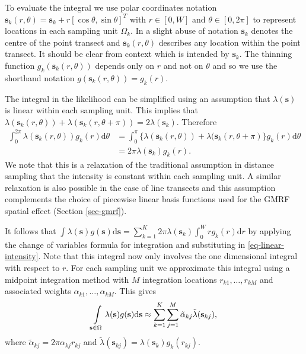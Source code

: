 \documentclass{statsoc}
\newcommand{\bs}{\mathbf{s}}
\newcommand{\tl}{\tilde{\lambda}}   %
\begin{document}
To evaluate the integral we use polar coordinates notation $\bs_k(r, \theta) = \bs_k + r\left[\cos\theta, \sin\theta \right]^T$ with $r \in [0, W]$ and $\theta \in [0, 2\pi]$ to represent locations in each sampling unit $\Omega_k$.  In a slight abuse of notation $\bs_k$ denotes the centre of the point transect and $\bs_k(r,\theta)$ describes any location within the point transect.  It should be clear from context which is intended by $\bs_k$.   The thinning function $g_k(\bs_k(r, \theta))$ depends only on $r$ and not on $\theta$ and so we use the shorthand notation $ g(\bs_k(r, \theta)) = g_k(r)$. 

The integral in the likelihood can be simplified using an assumption that $\lambda(\bs)$ is linear within each sampling unit.  This implies that $\lambda(\bs_k(r, \theta)) + \lambda(\bs_k(r, \theta + \pi)) = 2\lambda(\bs_k)$.  Therefore
\begin{align}
\label{eq-linear-intensity}
	\int_0^{2\pi} \lambda(\bs_k(r, \theta))g_k(r)\mathrm{d}\theta &= \int_0^\pi \{\lambda(\bs_k(r, \theta)) + \lambda(\bs_k(r, \theta + \pi) \} g_k(r)\mathrm{d}\theta \nonumber \\
	&= 2\pi \lambda(\bs_k)g_k(r).
\end{align}
We note that this is a relaxation of the traditional assumption in distance sampling that the intensity is constant within each sampling unit.  A similar relaxation is also possible in the case of line transects \citep{yuan_point_2017} and this assumption complements the choice of piecewise linear basis functions used for the GMRF spatial effect (Section \ref{sec-gmrf}).  

It follows that $\int \lambda(\bs)g(\bs) \mathrm{d}\bs = \sum_{k=1}^K 2\pi \lambda(\bs_k) \int_0^W r g_k(r)\mathrm{d}r$ by applying the change of variables formula for integration and substituting in \eqref{eq-linear-intensity}.  Note that this integral now only involves the one dimensional integral with respect to $r$.  For each sampling unit we approximate this integral using a midpoint integration method with $M$ integration locations $r_{k1}, \ldots, r_{kM}$ and associated weights $\alpha_{k1}, \ldots, \alpha_{kM}$.  This gives
\begin{equation*}
	\int\displaylimits_{\bs \in \Omega} \lambda(\bs)g(\bs)\mathrm{d}\bs \approx \sum_{k=1}^K \sum_{j=1}^M \tilde{\alpha}_{kj} \tl(\bs_{kj}) ,
\end{equation*}
where $\tilde{\alpha}_{kj} = 2\pi \alpha_{kj}r_{kj}$ and $\tl(\bs_{kj}) = \lambda(\bs_k) g_k(r_{kj})$.
\end{document}
